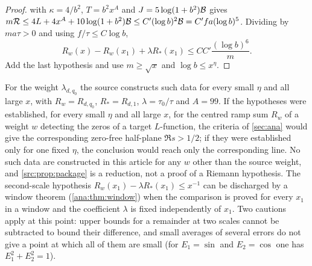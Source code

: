 \begin{proof}
 with $\kappa=4/b^2$, $T=b^2x^A$ and $J=5\log(1+b^2)\mathcal{B}$ gives
$m\mathcal{R}\le4L+4x^A+10\log(1+b^2)\mathcal{B}\le C'(\log b)^2\mathcal{B}=C'fa(\log b)^5$. Dividing by
$ma\tau>0$ and using $f/\tau\le C\log b$,
\[
R_w(x)-R_w(x_1)+\lambda R_*(x_1)\le CC'\frac{(\log b)^6}{m} .
\]
Add the last hypothesis and use $m\ge\sqrt x$ and $\log b\le x^\eta$.
\end{proof}

For the weight $\lambda_{d,q_0}$ the source constructs such data for every small $\eta$ and all
large $x$, with $R_w=R_{d,q_0}$, $R_*=R_{d,1}$, $\lambda=\tau_0/\tau$ and $A=99$. If the
hypotheses were established, for every small $\eta$ and all large $x$, for the centred ramp
sum $R_w$ of a weight $w$ detecting the zeros of a target $L$-function, the criteria of
\cref{sec:ana} would give the corresponding zero-free half-plane $\Re s>1/2$; if they were
established only for one fixed $\eta$, the conclusion would reach only the corresponding
line. No such data are constructed in this article for any $w$ other than the source weight,
and \cref{src:prop:package} is a reduction, not a proof of a Riemann hypothesis. The
second-scale hypothesis $R_w(x_1)-\lambda R_*(x_1)\le x^{-1}$ can be discharged by a window
theorem (\cref{ana:thm:window}) when the comparison is proved for every $x_1$ in a window and
the coefficient $\lambda$ is fixed independently of $x_1$. Two cautions apply at this point:
upper bounds for a remainder at two scales cannot be subtracted to bound their difference, and
small averages of several errors do not give a point at which all of them are small (for
$E_1=\sin$ and $E_2=\cos$ one has $E_1^2+E_2^2=1$).

